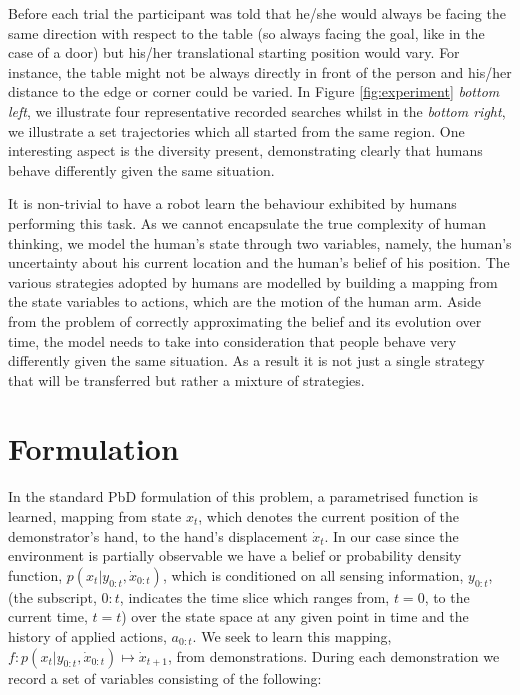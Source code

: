 Before each trial the participant was told that he/she would always be facing the same direction with respect to the table (so always facing the goal, 
like in the case of a door) but his/her translational starting position would vary. 
For instance, the table might not be always directly in front of the person and his/her distance to the edge or 
corner could be varied. In Figure \ref{fig:experiment}
\textit{bottom left}, we illustrate four representative recorded searches whilst in the \textit{bottom right}, we illustrate a set trajectories 
which all started from the same region. One interesting aspect is the diversity present,
demonstrating clearly that humans behave differently given the same situation.  

It is non-trivial to have a robot learn the behaviour exhibited by humans performing this task. As we cannot encapsulate the true complexity of 
human thinking, we model the human's state through two variables, namely, the human's uncertainty about his current location and the human's  
belief of his position. The various strategies adopted by humans are modelled by building a mapping from the state variables to actions, which are the motion of 
the human arm. Aside from the problem of correctly approximating the belief and its evolution over time, the model needs to take into consideration
that people behave very differently given the same situation. As a result it is not just a single strategy that will be transferred but rather a mixture 
of strategies. 


\section{Formulation} \label{ch3:formulation}

In the standard PbD formulation of this problem, a parametrised function is learned,
mapping from state $x_t$, which denotes the current position of the demonstrator's hand, to  
the hand's displacement $\dot{x}_t$. In our case since the environment is partially observable 
we have a belief or probability density function, $p(x_{t}|y_{0:t},\dot{x}_{0:t})$, which is conditioned on all 
sensing information, $y_{0:t}$, (the subscript, $0:t$, indicates the time slice which ranges from, $t=0$, to 
the current time, $t=t$) over the state space at any given point in time and the history of applied actions, $a_{0:t}$. 
We seek to learn this mapping, $f : p(x_{t}|y_{0:t},\dot{x}_{0:t}) \mapsto \dot{x}_{t+1}$, from demonstrations. During 
each demonstration we record a set of variables consisting of the following:

